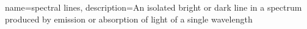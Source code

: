 {
    name=spectral lines,
    description={An isolated bright or dark line in a spectrum produced by emission or absorption of light of a single wavelength}
}
